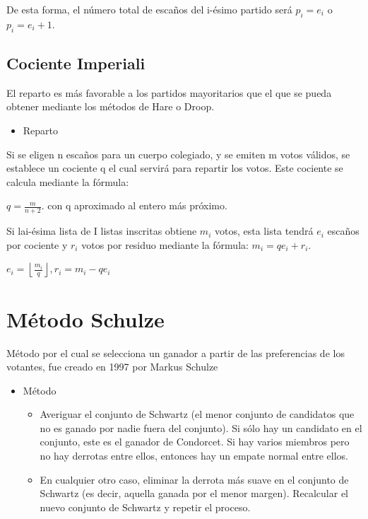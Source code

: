 \documentclass[12pt,a4paper,]{book}
\providecommand{\tightlist}{%
  \setlength{\itemsep}{0pt}\setlength{\parskip}{0pt}}
\numberwithin{dummy}{section}
\theoremstyle{ocrenumbox}
\theoremstyle{blacknumex}
\theoremstyle{blacknumbox}
\theoremstyle{ocrenum}
\theoremstyle{ocrenum}
\begin{document}
De esta forma, el número total de escaños del i-ésimo partido será
\({p_{i}=e_{i}}\) o \({p_{i}=e_{i}+1}\).

\hypertarget{cociente-imperiali}{%
\subsection{Cociente Imperiali}\label{cociente-imperiali}}

El reparto es más favorable a los partidos mayoritarios que el que se
pueda obtener mediante los métodos de Hare o Droop.

\begin{itemize}
\tightlist
\item
  Reparto
\end{itemize}

Si se eligen n escaños para un cuerpo colegiado, y se emiten m votos
válidos, se establece un cociente q el cual servirá para repartir los
votos. Este cociente se calcula mediante la fórmula:

\({q={\frac {m}{n+2}}.}\) con q aproximado al entero más próximo.

Si lai-ésima lista de I listas inscritas obtiene \({m_{i}}\) votos, esta
lista tendrá \({e_{i}}\) escaños por cociente y \({r_{i}}\) votos por
residuo mediante la fórmula: \({m_{i}=qe_{i}+r_{i}}\).

\({e_{i}=\left\lfloor {\frac {m_{i}}{q}}\right\rfloor ,r_{i}=m_{i}-qe_{i}}\)

\hypertarget{muxe9todo-schulze}{%
\section{Método Schulze}\label{muxe9todo-schulze}}

Método por el cual se selecciona un ganador a partir de las preferencias
de los votantes, fue creado en 1997 por Markus Schulze

\begin{itemize}
\item
  Método

  \begin{itemize}
  \tightlist
  \item
    Averiguar el conjunto de Schwartz (el menor conjunto de candidatos
    que no es ganado por nadie fuera del conjunto). Si sólo hay un
    candidato en el conjunto, este es el ganador de Condorcet. Si hay
    varios miembros pero no hay derrotas entre ellos, entonces hay un
    empate normal entre ellos.
  \item
    En cualquier otro caso, eliminar la derrota más suave en el conjunto
    de Schwartz (es decir, aquella ganada por el menor margen).
    Recalcular el nuevo conjunto de Schwartz y repetir el proceso.
  \end{itemize}
\end{itemize}
\end{document}
